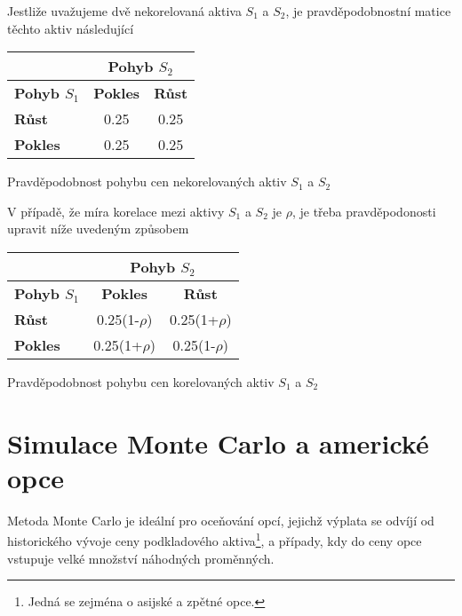 \documentclass[a4paper]{book}
\begin{document}
Jestliže uvažujeme dvě nekorelovaná aktiva $S_1$ a $S_2$, je pravděpodobnostní matice těchto aktiv následující
\begin{center}
\begin{tabular}{c c c}
\textbf{} &
\multicolumn{2}{c}{\textbf{Pohyb $S_2$}}\\
\hline
\multicolumn {1}{l|}{\textbf{Pohyb $S_1$}} &
\textbf{Pokles} &
\textbf{Růst} \\
\hline
\multicolumn {1}{l|}{\textbf{Růst}} & 0.25 & 0.25 \\ 
\multicolumn {1}{l|}{\textbf{Pokles}} & 0.25 & 0.25 \\
\hline
\end{tabular}
\end{center}
\begin{center}
\small{Pravděpodobnost pohybu cen nekorelovaných aktiv $S_1$ a $S_2$}
\end{center}
V případě, že míra korelace mezi aktivy $S_1$ a $S_2$ je $\rho$, je třeba pravděpodonosti upravit níže uvedeným způsobem
\begin{center}
\begin{tabular}{c c c}
\textbf{} &
\multicolumn{2}{c}{\textbf{Pohyb $S_2$}}\\
\hline
\multicolumn {1}{l|}{\textbf{Pohyb $S_1$}} &
\textbf{Pokles} &
\textbf{Růst} \\
\hline
\multicolumn {1}{l|}{\textbf{Růst}} & 0.25(1-$\rho$) & 0.25(1+$\rho$) \\ 
\multicolumn {1}{l|}{\textbf{Pokles}} & 0.25(1+$\rho$) & 0.25(1-$\rho$) \\
\hline
\end{tabular}
\end{center}
\begin{center}
\small{Pravděpodobnost pohybu cen korelovaných aktiv $S_1$ a $S_2$}
\end{center}

\section{Simulace Monte Carlo a americké opce}

Metoda Monte Carlo je ideální pro oceňování opcí, jejichž výplata se odvíjí od historického vývoje ceny podkladového aktiva\footnote{Jedná se zejména o asijské a zpětné opce.}, a případy, kdy do ceny opce vstupuje velké množství náhodných proměnných.
\end{document}
